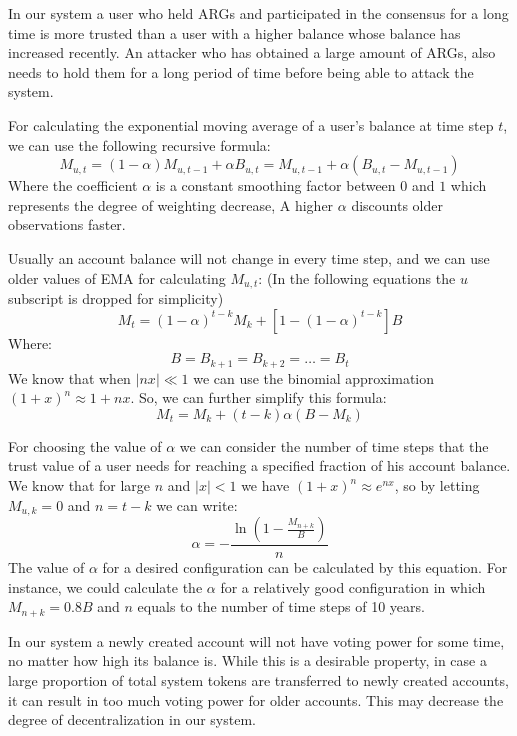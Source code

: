\documentclass[11pt, a4paper]{report}
\begin{document}
    In our system a user who held ARGs and participated in the consensus for a long time is more trusted
    than a user with a higher balance whose balance has increased recently. An attacker who has obtained a large
    amount of ARGs, also needs to hold them for a long period of time before being able to attack the system.

    For calculating the exponential moving average of a user's balance at time step \(t\), we can use the following
    recursive formula:
    \[
        M_{u,t} = (1 - \alpha) M_{u,t-1} + \alpha B_{u,t} = M_{u,t-1} + \alpha (B_{u,t} - M_{u,t-1})
    \]
    Where the coefficient \(\alpha\) is a constant smoothing factor between \(0\) and \(1\) which represents the
    degree of weighting decrease, A higher \(\alpha\) discounts older observations faster.

    Usually an account balance will not change in every time step, and we can use older values of EMA for calculating
    \(M_{u,t}\): (In the following equations the \(u\) subscript is dropped for simplicity)
    \[
        M_{t} = (1 - \alpha)^{t-k}M_{k} + [1 - (1 - \alpha)^{t - k}]B
    \]
    Where:
    \[
        B = B_{k+1} = B_{k+2} = \dots = B_{t}
    \]
    We know that when \(|nx| \ll 1\) we can use the binomial approximation \({(1 + x)^n \approx 1 + nx}\). So, we can
    further simplify this formula:
    \[
        M_{t} = M_{k} + (t - k) \alpha (B - M_{k})
    \]

    For choosing the value of \(\alpha\) we can consider the number of time steps that the trust value of a user needs
    for reaching a specified fraction of his account balance. We know that for large \(n\) and \(|x| < 1\) we have
    \((1 + x)^n \approx e^{nx}\), so by letting \(M_{u,k} = 0\) and \(n = t - k\) we can write:
    \[
        \alpha =- \frac{\ln\left(1 - \frac{M_{n+k}}{B}\right)}{n}
    \]
    The value of \(\alpha\) for a desired configuration can be calculated by this equation. For instance, we could
    calculate the \(\alpha\) for a relatively good configuration in which \(M_{n+k} = 0.8B\) and \(n\) equals to the
    number of time steps of 10 years.

    In our system a newly created account will not have voting power for some time, no matter how high its
    balance is. While this is a desirable property, in case a large proportion of total system tokens are
    transferred to newly created accounts, it can result in too much voting power for older accounts. This may decrease
    the degree of decentralization in our system.
\end{document}
